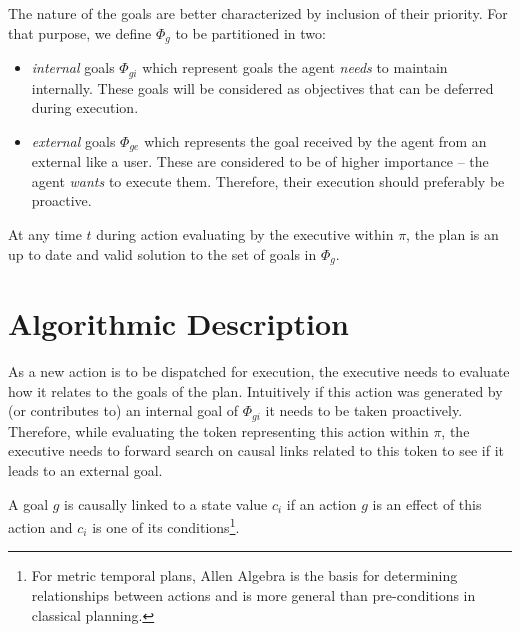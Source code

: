 The nature of the goals are better characterized by inclusion of their
priority. For that purpose, we define $\Phi_g$ to be partitioned in two:

\begin{itemize}

\item \emph{internal} goals $\Phi_{gi}$ which represent goals the
  agent {\em needs} to maintain internally. These goals will be
  considered as objectives that can be deferred during execution.

\item \emph{external} goals $\Phi_{ge}$ which represents the goal
  received by the agent from an external like a user. These are
  considered to be of higher importance -- \ie the agent {\em wants}
  to execute them. Therefore, their execution should preferably be
  proactive.

\end{itemize}

At any time $t$ during action evaluating by the executive within
$\pi$, the plan is an up to date and valid solution to the set of
goals in $\Phi_g$.


\section{Algorithmic Description}
\label{sec:algo}

As a new action is to be dispatched for execution, the executive needs
to evaluate how it relates to the goals of the plan. Intuitively if
this action was generated by (or contributes to) an internal goal of
$\Phi_{gi}$ it needs to be taken proactively. Therefore, while
evaluating the token representing this action within $\pi$, the
executive needs to forward search on causal links related to this
token to see if it leads to an external goal.


\begin{definition}
  \label{def:subgoalLink}
  A goal $g$ is causally linked to a state value $c_i$ if an action
  $g$ is an effect of this action and $c_i$ is one of its
  conditions\footnote{For metric temporal plans, Allen Algebra
    \cite{allen84} is the basis for determining relationships between
    actions and is more general than pre-conditions in classical
    planning.}.
\end{definition}

